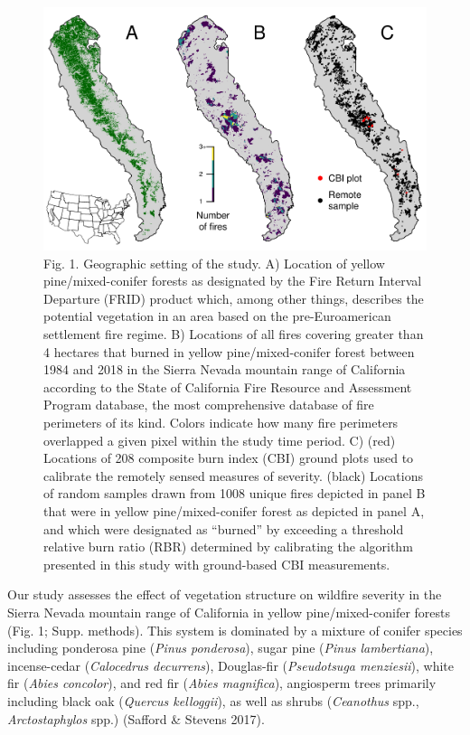 \documentclass[]{article}
\begin{document}
\begin{figure}
\centering
\includegraphics{../../figures/study-geographic-setting.pdf}
\caption{Fig. 1. Geographic setting of the study. A) Location of yellow
pine/mixed-conifer forests as designated by the Fire Return Interval
Departure (FRID) product which, among other things, describes the
potential vegetation in an area based on the pre-Euroamerican settlement
fire regime. B) Locations of all fires covering greater than 4 hectares
that burned in yellow pine/mixed-conifer forest between 1984 and 2018 in
the Sierra Nevada mountain range of California according to the State of
California Fire Resource and Assessment Program database, the most
comprehensive database of fire perimeters of its kind. Colors indicate
how many fire perimeters overlapped a given pixel within the study time
period. C) (red) Locations of 208 composite burn index (CBI) ground
plots used to calibrate the remotely sensed measures of severity.
(black) Locations of random samples drawn from 1008 unique fires
depicted in panel B that were in yellow pine/mixed-conifer forest as
depicted in panel A, and which were designated as ``burned'' by
exceeding a threshold relative burn ratio (RBR) determined by
calibrating the algorithm presented in this study with ground-based CBI
measurements.}
\end{figure}

Our study assesses the effect of vegetation structure on wildfire
severity in the Sierra Nevada mountain range of California in yellow
pine/mixed-conifer forests (Fig. 1; Supp. methods). This system is
dominated by a mixture of conifer species including ponderosa pine
(\emph{Pinus ponderosa}), sugar pine (\emph{Pinus lambertiana}),
incense-cedar (\emph{Calocedrus decurrens}), Douglas-fir
(\emph{Pseudotsuga menziesii}), white fir (\emph{Abies concolor}), and
red fir (\emph{Abies magnifica}), angiosperm trees primarily including
black oak (\emph{Quercus kelloggii}), as well as shrubs
(\emph{Ceanothus} spp., \emph{Arctostaphylos} spp.) (Safford \& Stevens
2017).
\end{document}
